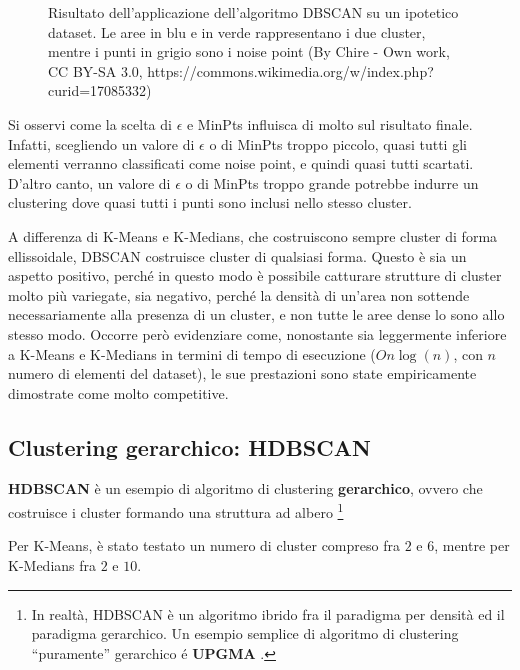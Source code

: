 \documentclass[a4paper, 12pt]{report}
\begin{document}
				\begin{figure}[H]
					\centering
					
					\caption{Risultato dell'applicazione dell'algoritmo DBSCAN su un
					ipotetico dataset. Le aree in blu e in verde rappresentano i due
					cluster, mentre i punti in grigio sono i noise point (By Chire -
					Own work, CC BY-SA 3.0, https://commons.wikimedia.org/w/index.php?curid=17085332)}
					\label{fig:dbscan-density-data}
				\end{figure}

				Si osservi come la scelta di $\epsilon$ e MinPts influisca di molto
				sul risultato finale. Infatti, scegliendo un valore di $\epsilon$ o
				di MinPts troppo piccolo, quasi tutti gli elementi verranno classificati
				come noise point, e quindi quasi tutti scartati. D'altro canto, un valore
				di $\epsilon$ o di MinPts troppo grande potrebbe indurre un clustering
				dove quasi tutti i punti sono inclusi nello stesso cluster.

				A differenza di K-Means e K-Medians, che costruiscono sempre cluster
				di forma ellissoidale, DBSCAN costruisce cluster di qualsiasi forma.
				Questo è sia un aspetto positivo, perché in questo modo è possibile
				catturare strutture di cluster molto più variegate, sia negativo,
				perché la densità di un'area non sottende necessariamente alla
				presenza di un cluster, e non tutte le aree dense lo sono allo
				stesso modo. Occorre però evidenziare come, nonostante sia leggermente
				inferiore a K-Means e K-Medians in termini di tempo di esecuzione
				($O n \log(n)$, con $n$ numero di elementi del dataset), le sue
				prestazioni sono state empiricamente dimostrate come molto competitive.

			\subsection{Clustering gerarchico: HDBSCAN}

				\textbf{HDBSCAN} è un esempio di algoritmo di clustering
				\textbf{gerarchico}, ovvero che costruisce i cluster formando
				una struttura ad albero \footnote{In realtà, HDBSCAN è un
				algoritmo ibrido fra il paradigma per densità ed il paradigma
				gerarchico. Un esempio semplice di algoritmo di clustering
				``puramente'' gerarchico é \textbf{UPGMA} \cite{Sokal1958ASM}.}

			Per K-Means, è stato testato un numero di cluster compreso fra $2$ e
			$6$, mentre per K-Medians fra $2$ e $10$.
\end{document}
